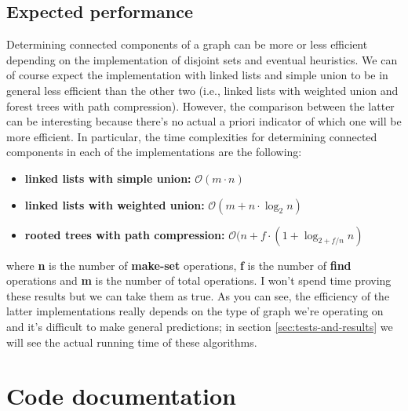 \documentclass[11pt]{article}
\begin{document}
    \subsection{Expected performance}
    Determining connected components of a graph can be more or less efficient depending on the implementation of disjoint sets and eventual heuristics.
    We can of course expect the implementation with linked lists and simple union to be in general less efficient than the other two (i.e., linked lists with weighted union and forest trees with path compression). However, the comparison between the latter can be interesting because there's no actual a priori indicator of which one will be more efficient.
    In particular, the time complexities for determining connected components in each of the implementations are the following:
    \begin{itemize}
        \item \textbf{linked lists with simple union:} $\mathcal{O}(m\cdot n) $
        \item \textbf{linked lists with weighted union:} $\mathcal{O}(m + n \cdot \log_{2}n)$
        \item \textbf{rooted trees with path compression:} $\mathcal{O}(n + f \cdot (1 + \log_{2+f/n}n)$
    \end{itemize}
    where \textbf{n} is the number of \textbf{make-set} operations, \textbf{f} is the number of \textbf{find} operations and \textbf{m} is the number of total operations. I won't spend time proving these results but we can take them as true. As you can see, the efficiency of the latter implementations really depends on the type of graph we're operating on and it's difficult to make general predictions;  in section \ref{sec:tests-and-results} we will see the actual running time of these algorithms. 

    \section{Code documentation}
\end{document}
